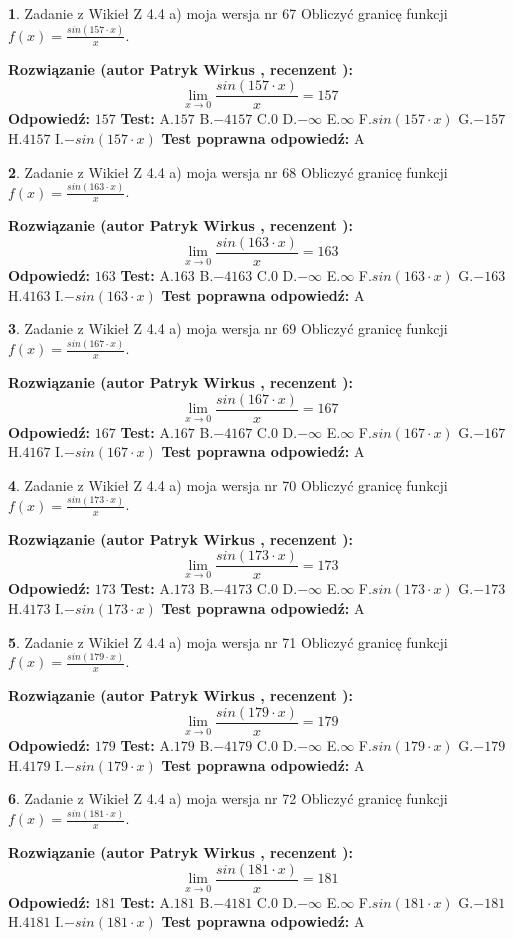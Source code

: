 \documentclass[12pt, a4paper]{article}
\theoremstyle{definition} %
\newtheorem{zad}{}
\newcommand{\zadStart}[1]{\begin{zad}#1\newline}
\newcommand{\zadStop}{\end{zad}}
\newcommand{\rozwStart}[2]{\noindent \textbf{Rozwiązanie (autor #1 , recenzent #2): }\newline}
\newcommand{\rozwStop}{\newline}
\newcommand{\odpStart}{\noindent \textbf{Odpowiedź:}\newline}
\newcommand{\odpStop}{\newline}
\newcommand{\testStart}{\noindent \textbf{Test:}\newline}
\newcommand{\testStop}{\newline}
\newcommand{\kluczStart}{\noindent \textbf{Test poprawna odpowiedź:}\newline}
\newcommand{\kluczStop}{\newline}
\begin{document}
\zadStart{Zadanie z Wikieł Z 4.4 a) moja wersja nr 67}
Obliczyć granicę funkcji $f(x)=\frac{sin(157\cdot x)}{x}$.
\zadStop
\rozwStart{Patryk Wirkus}{}
$$\lim\limits_{x\to 0}\frac{sin(157\cdot x)}{x}=
157$$
\rozwStop
\odpStart
$157$
\odpStop
\testStart
A.$157$
B.$-4157$
C.$0$
D.$-\infty$
E.$\infty$
F.$sin(157\cdot x)$
G.$-157$
H.$4157$
I.$-sin(157\cdot x)$
\testStop
\kluczStart
A
\kluczStop



\zadStart{Zadanie z Wikieł Z 4.4 a) moja wersja nr 68}
Obliczyć granicę funkcji $f(x)=\frac{sin(163\cdot x)}{x}$.
\zadStop
\rozwStart{Patryk Wirkus}{}
$$\lim\limits_{x\to 0}\frac{sin(163\cdot x)}{x}=
163$$
\rozwStop
\odpStart
$163$
\odpStop
\testStart
A.$163$
B.$-4163$
C.$0$
D.$-\infty$
E.$\infty$
F.$sin(163\cdot x)$
G.$-163$
H.$4163$
I.$-sin(163\cdot x)$
\testStop
\kluczStart
A
\kluczStop



\zadStart{Zadanie z Wikieł Z 4.4 a) moja wersja nr 69}
Obliczyć granicę funkcji $f(x)=\frac{sin(167\cdot x)}{x}$.
\zadStop
\rozwStart{Patryk Wirkus}{}
$$\lim\limits_{x\to 0}\frac{sin(167\cdot x)}{x}=
167$$
\rozwStop
\odpStart
$167$
\odpStop
\testStart
A.$167$
B.$-4167$
C.$0$
D.$-\infty$
E.$\infty$
F.$sin(167\cdot x)$
G.$-167$
H.$4167$
I.$-sin(167\cdot x)$
\testStop
\kluczStart
A
\kluczStop



\zadStart{Zadanie z Wikieł Z 4.4 a) moja wersja nr 70}
Obliczyć granicę funkcji $f(x)=\frac{sin(173\cdot x)}{x}$.
\zadStop
\rozwStart{Patryk Wirkus}{}
$$\lim\limits_{x\to 0}\frac{sin(173\cdot x)}{x}=
173$$
\rozwStop
\odpStart
$173$
\odpStop
\testStart
A.$173$
B.$-4173$
C.$0$
D.$-\infty$
E.$\infty$
F.$sin(173\cdot x)$
G.$-173$
H.$4173$
I.$-sin(173\cdot x)$
\testStop
\kluczStart
A
\kluczStop



\zadStart{Zadanie z Wikieł Z 4.4 a) moja wersja nr 71}
Obliczyć granicę funkcji $f(x)=\frac{sin(179\cdot x)}{x}$.
\zadStop
\rozwStart{Patryk Wirkus}{}
$$\lim\limits_{x\to 0}\frac{sin(179\cdot x)}{x}=
179$$
\rozwStop
\odpStart
$179$
\odpStop
\testStart
A.$179$
B.$-4179$
C.$0$
D.$-\infty$
E.$\infty$
F.$sin(179\cdot x)$
G.$-179$
H.$4179$
I.$-sin(179\cdot x)$
\testStop
\kluczStart
A
\kluczStop



\zadStart{Zadanie z Wikieł Z 4.4 a) moja wersja nr 72}
Obliczyć granicę funkcji $f(x)=\frac{sin(181\cdot x)}{x}$.
\zadStop
\rozwStart{Patryk Wirkus}{}
$$\lim\limits_{x\to 0}\frac{sin(181\cdot x)}{x}=
181$$
\rozwStop
\odpStart
$181$
\odpStop
\testStart
A.$181$
B.$-4181$
C.$0$
D.$-\infty$
E.$\infty$
F.$sin(181\cdot x)$
G.$-181$
H.$4181$
I.$-sin(181\cdot x)$
\testStop
\kluczStart
A
\kluczStop
\end{document}
